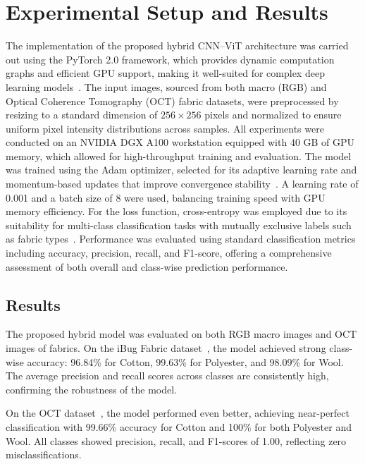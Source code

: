 \section{Experimental Setup and Results}

The implementation of the proposed hybrid CNN–ViT architecture was carried out using the PyTorch 2.0 framework, which provides dynamic computation graphs and efficient GPU support, making it well-suited for complex deep learning models~\cite{paszke2019pytorch}. The input images, sourced from both macro (RGB) and Optical Coherence Tomography (OCT) fabric datasets, were preprocessed by resizing to a standard dimension of $256 \times 256$ pixels and normalized to ensure uniform pixel intensity distributions across samples. All experiments were conducted on an NVIDIA DGX A100 workstation equipped with 40 GB of GPU memory, which allowed for high-throughput training and evaluation. The model was trained using the Adam optimizer, selected for its adaptive learning rate and momentum-based updates that improve convergence stability~\cite{kingma2014adam}. A learning rate of 0.001 and a batch size of 8 were used, balancing training speed with GPU memory efficiency. For the loss function, cross-entropy was employed due to its suitability for multi-class classification tasks with mutually exclusive labels such as fabric types~\cite{goodfellow2016deep}. Performance was evaluated using standard classification metrics including accuracy, precision, recall, and F1-score, offering a comprehensive assessment of both overall and class-wise prediction performance.

\subsection{Results}

The proposed hybrid model was evaluated on both RGB macro images and OCT images of fabrics. On the iBug Fabric dataset~\cite{researchgate}, the model achieved strong class-wise accuracy: 96.84\% for Cotton, 99.63\% for Polyester, and 98.09\% for Wool. The average precision and recall scores across classes are consistently high, confirming the robustness of the model.

On the OCT dataset~\cite{kampouris2016fine}, the model performed even better, achieving near-perfect classification with 99.66\% accuracy for Cotton and 100\% for both Polyester and Wool. All classes showed precision, recall, and F1-scores of 1.00, reflecting zero misclassifications.

